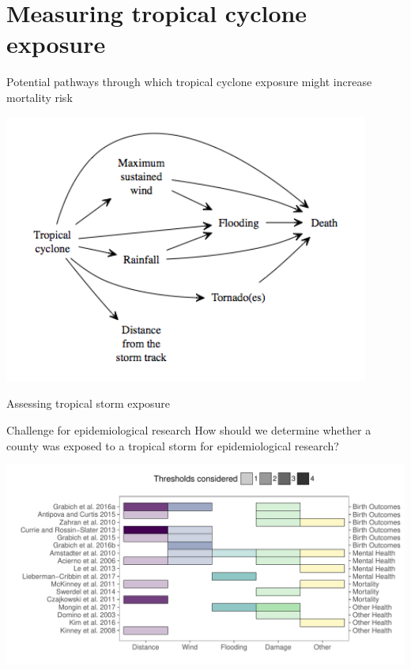 \documentclass[ignorenonframetext,]{beamer}
\begin{document}
\section{Measuring tropical cyclone
exposure}\label{measuring-tropical-cyclone-exposure}

\begin{frame}{Potential pathways through which tropical cyclone exposure
might increase mortality risk}

\begin{center}\includegraphics[width=0.9\textwidth]{figures/storm_death_pathways} \end{center}

\end{frame}

\begin{frame}{Assessing tropical storm exposure}

\begin{block}{Challenge for epidemiological research}
How should we determine whether a county was exposed to a tropical storm for epidemiological research?
\end{block}

\vspace{-0.3cm}

\begin{center}\includegraphics[width=\textwidth]{figures/previous_exposure_metrics} \end{center}

\end{frame}
\end{document}
